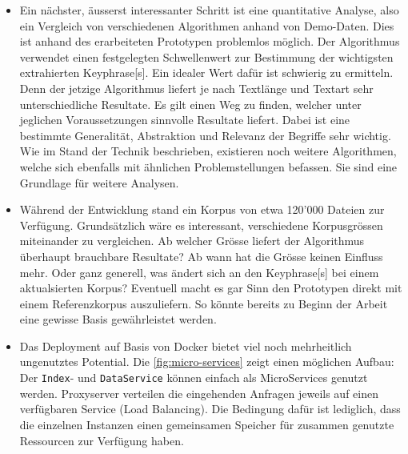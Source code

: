\begin{itemize}
    \item Ein nächster, äusserst interessanter Schritt ist eine quantitative Analyse, also ein Vergleich von verschiedenen Algorithmen anhand von Demo-Daten. Dies ist anhand des erarbeiteten Prototypen problemlos möglich. Der Algorithmus verwendet einen festgelegten Schwellenwert zur Bestimmung der wichtigsten extrahierten \gls{Keyphrase}[s]. Ein idealer Wert dafür ist schwierig zu ermitteln. Denn der jetzige Algorithmus liefert je nach Textlänge und Textart sehr unterschiedliche Resultate. Es gilt einen Weg zu finden, welcher unter jeglichen Voraussetzungen sinnvolle Resultate liefert. Dabei ist eine bestimmte Generalität, Abstraktion und Relevanz der Begriffe sehr wichtig. Wie im Stand der Technik beschrieben, existieren noch weitere Algorithmen, welche sich ebenfalls mit ähnlichen Problemstellungen befassen. Sie sind eine Grundlage für weitere Analysen.
    \item Während der Entwicklung stand ein Korpus von etwa 120'000 Dateien zur Verfügung. Grundsätzlich wäre es interessant, verschiedene Korpusgrössen miteinander zu vergleichen. Ab welcher Grösse liefert der Algorithmus überhaupt brauchbare Resultate? Ab wann hat die Grösse keinen Einfluss mehr. Oder ganz generell, was ändert sich an den \gls{Keyphrase}[s] bei einem aktualsierten Korpus? Eventuell macht es gar Sinn den Prototypen direkt mit einem Referenzkorpus auszuliefern. So könnte bereits zu Beginn der Arbeit eine gewisse Basis gewährleistet werden. %
    \item Das Deployment auf Basis von Docker bietet viel noch mehrheitlich ungenutztes Potential. Die \autoref{fig:micro-services} zeigt einen möglichen Aufbau: Der \texttt{Index}- und \texttt{DataService} können einfach als MicroServices genutzt werden. Proxyserver verteilen die eingehenden Anfragen jeweils auf einen verfügbaren Service (Load Balancing). Die Bedingung dafür ist lediglich, dass die einzelnen Instanzen einen gemeinsamen Speicher für zusammen genutzte Ressourcen zur Verfügung haben.
    

\end{itemize}
